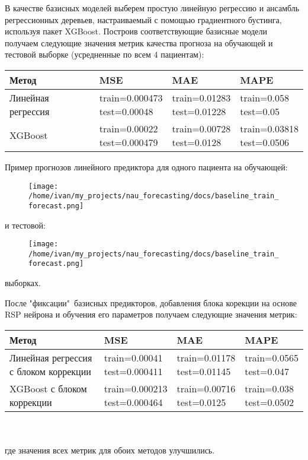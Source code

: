 \documentclass[11pt]{article}
\begin{document}
В качестве базисных моделей выберем простую линейную регрессию и ансамбль регрессионных деревьев, настраиваемый с помощью градиентного бустинга, используя пакет XGBoost. Построив соответствующие базисные модели получаем следующие значения метрик качества прогноза на обучающей и тестовой выборке (усредненные по всем 4 пациентам):

\begin{tabular}{ |p{3cm}|p{3cm}|p{3cm}|p{3cm}|  }
 \hline
 Метод & MSE &  MAE & MAPE \\
 \hline
 Линейная регрессия &
 \makecell{train=0.000473 \\ test=0.00048} &
 \makecell{train=0.01283 \\ test=0.01228} &
 \makecell{train=0.058 \\ test=0.05} \\
 \hline
 XGBoost &
 \makecell{train=0.00022 \\ test=0.000479} &
 \makecell{train=0.00728 \\ test=0.0128} &
 \makecell{train=0.03818 \\ test=0.0506} \\
 \hline
\end{tabular}

Пример прогнозов линейного предиктора для одного пациента на обучающей:
\begin{figure}[H]
\centering
\texttt{[image: /home/ivan/my\_projects/nau\_forecasting/docs/baseline\_train\_forecast.png]}
\label{}
\end{figure}
 и тестовой:
\begin{figure}[H]
\centering
\texttt{[image: /home/ivan/my\_projects/nau\_forecasting/docs/baseline\_train\_forecast.png]}
\label{}
\end{figure}
выборках.

После "фиксации"\ базисных предикторов, добавления блока корекции на основе RSP нейрона и обучения его параметров получаем следующие значения метрик:

\begin{tabular}{ |p{3cm}|p{3cm}|p{3cm}|p{3cm}|  }
 \hline
 Метод & MSE &  MAE & MAPE \\
 \hline
 Линейная регрессия с блоком коррекции &
 \makecell{train=0.00041 \\ test=0.000411} &
 \makecell{train=0.01178 \\ test=0.01145} &
 \makecell{train=0.0565 \\ test=0.047} \\
 \hline
 XGBoost с блоком коррекции &
 \makecell{train=0.000213 \\ test=0.000464} &
 \makecell{train=0.00716 \\ test=0.0125} &
 \makecell{train=0.038 \\ test=0.0502} \\
 \hline
\end{tabular}
\\
\\
где значения всех метрик для обоих методов улучшились.
\end{document}
